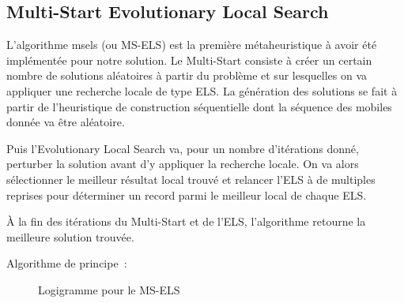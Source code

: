 		\subsection{Multi-Start Evolutionary Local Search}

			L'algorithme \acrlong{msels} (ou MS-ELS) est la première métaheuristique à avoir été implémentée pour notre solution. Le Multi-Start consiste à créer un certain nombre de solutions aléatoires à partir du problème et sur lesquelles on va appliquer une recherche locale de type ELS. La génération des solutions se fait à partir de l'heuristique de construction séquentielle dont la séquence des mobiles donnée va être aléatoire.

			Puis l'Evolutionary Local Search va, pour un nombre d'itérations donné, perturber la solution avant d'y appliquer la recherche locale. On va alors sélectionner le meilleur résultat local trouvé et relancer l'ELS à de multiples reprises pour déterminer un record parmi le meilleur local de chaque ELS.

			À la fin des itérations du Multi-Start et de l'ELS, l'algorithme retourne la meilleure solution trouvée.

			Algorithme de principe :
			\begin{code}
				\begin{algo}[informal]
					\BEGIN
									\ENDIF
								\ENDFOR
								\ENDIF
							\ENDFOR
						\ENDFOR
					\END
				\end{algo}
			\end{code}

			\begin{figure}[h!]
				\centering
				\begin{tikzpicture}[node distance=1cm]
					
				\end{tikzpicture}
				\caption{Logigramme pour le MS-ELS}
				\label{fig:ms-els-logigram}
			\end{figure}

